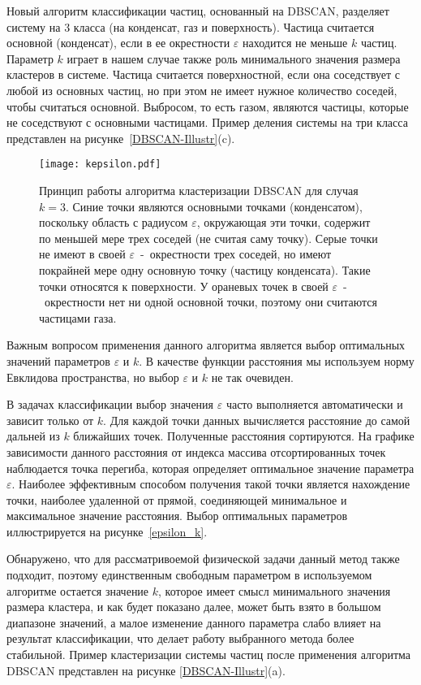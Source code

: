 Новый алгоритм классификации частиц, основанный на DBSCAN, разделяет систему на 3 класса (на конденсат, газ и поверхность).
Частица считается основной (конденсат), если в ее окрестности $\varepsilon$ находится не меньше $k$ частиц.
Параметр $k$ играет в нашем случае также роль минимального значения размера кластеров в системе.
Частица считается поверхностной, если она соседствует с любой из основных частиц, но при этом не имеет нужное количество соседей, чтобы считаться основной.
Выбросом, то есть газом, являются частицы, которые не соседствуют с основными частицами.
Пример деления системы на три класса представлен на рисунке~\ref{DBSCAN-Illustr}(c).

\begin{figure}[!t]
  \centering
  \texttt{[image: kepsilon.pdf]}
  \caption{Принцип работы алгоритма кластеризации DBSCAN для случая $k = 3$.
    Синие точки являются основными точками (конденсатом), поскольку область с радиусом $\varepsilon$, окружающая эти точки, содержит по меньшей мере трех соседей (не считая саму точку).
    Серые точки не имеют в своей $\varepsilon$~-~окрестности трех соседей, но имеют покрайней мере одну основную точку (частицу конденсата).
    Такие точки относятся к поверхности.
    У ораневых точек в своей $\varepsilon$~-~окрестности нет ни одной основной точки, поэтому они считаются частицами газа.}
  \label{kepsilon}
\end{figure}

Важным вопросом применения данного алгоритма является выбор оптимальных значений параметров $\varepsilon$ и $k$.
В качестве функции расстояния мы используем норму Евклидова пространства, но выбор $\varepsilon$ и $k$ не так очевиден.

В задачах классификации выбор значения $\varepsilon$ часто выполняется автоматически и зависит только от $k$.
Для каждой точки данных вычисляется расстояние до самой дальней из $k$ ближайших точек.
Полученные расстояния сортируются.
На графике зависимости данного расстояния от индекса массива отсортированных точек наблюдается точка перегиба, которая определяет оптимальное значение параметра $\varepsilon$.
Наиболее эффективным способом получения такой точки является нахождение точки, наиболее удаленной от прямой, соединяющей минимальное и максимальное значение расстояния.
Выбор оптимальных параметров иллюстрируется на рисунке~\ref{epsilon_k}.

Обнаружено, что для рассматривоемой физической задачи данный метод также подходит, поэтому единственным свободным параметром в используемом алгоритме остается значение $k$, которое имеет смысл минимального значения размера кластера, и как будет показано далее, может быть взято в большом диапазоне значений, а малое изменение данного параметра слабо влияет на результат классификации, что делает работу выбранного метода более стабильной.
Пример кластеризации системы частиц после применения алгоритма DBSCAN представлен на рисунке \ref{DBSCAN-Illustr}(a).

